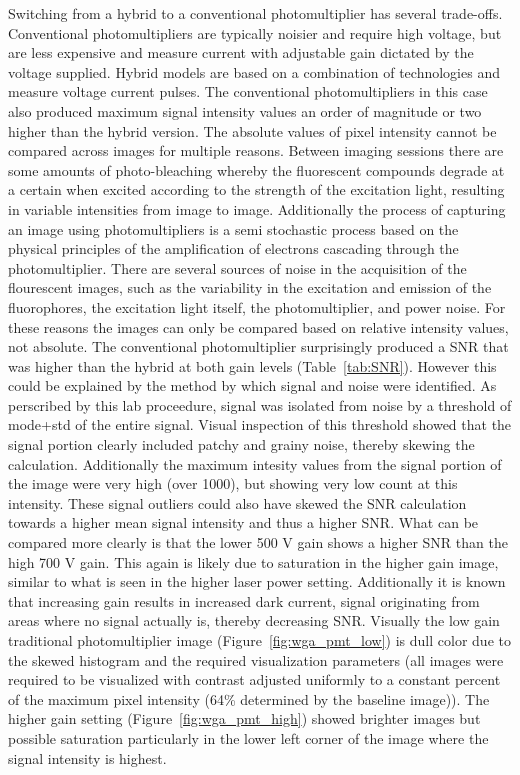 \documentclass[12pt]{article}
\begin{document}
Switching from a hybrid to a conventional photomultiplier has several trade-offs. Conventional photomultipliers are typically noisier and require high voltage, but are less expensive and measure current with adjustable gain dictated by the voltage supplied. Hybrid models are based on a combination of technologies and measure voltage current pulses. The conventional photomultipliers in this case also produced maximum signal intensity values an order of magnitude or two higher than the hybrid version. The absolute values of pixel intensity cannot be compared across images for multiple reasons. Between imaging sessions there are some amounts of photo-bleaching whereby the fluorescent compounds degrade at a certain when excited according to the strength of the excitation light, resulting in variable intensities from image to image. Additionally the process of capturing an image using photomultipliers is a semi stochastic process based on the physical principles of the amplification of electrons cascading through the photomultiplier. There are several sources of noise in the acquisition of the flourescent images, such as the variability in the excitation and emission of the fluorophores, the excitation light itself, the photomultiplier, and power noise. For these reasons the images can only be compared based on relative intensity values, not absolute. The conventional photomultiplier surprisingly produced a SNR that was higher than the hybrid at both gain levels (Table~\ref{tab:SNR}). However this could be explained by the method by which signal and noise were identified. As perscribed by this lab proceedure, signal was isolated from noise by a threshold of mode+std of the entire signal. Visual inspection of this threshold showed that the signal portion clearly included patchy and grainy noise, thereby skewing the calculation. Additionally the maximum intesity values from the signal portion of the image were very high (over 1000), but showing very low count at this intensity. These signal outliers could also have skewed the SNR calculation towards a higher mean signal intensity and thus a higher SNR. What can be compared more clearly is that the lower 500 V gain shows a higher SNR than the high 700 V gain. This again is likely due to saturation in the higher gain image, similar to what is seen in the higher laser power setting. Additionally it is known that increasing gain results in increased dark current, signal originating from areas where no signal actually is, thereby decreasing SNR. Visually the low gain traditional photomultiplier image (Figure~\ref{fig:wga_pmt_low}) is dull color due to the skewed histogram and the required visualization parameters (all images were required to be visualized with contrast adjusted uniformly to a constant percent of the maximum pixel intensity (64\% determined by the baseline image)). The higher gain setting (Figure~\ref{fig:wga_pmt_high}) showed brighter images but possible saturation particularly in the lower left corner of the image where the signal intensity is highest.
\end{document}
